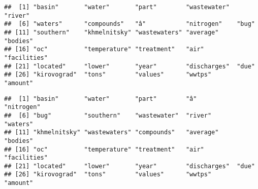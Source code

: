 \documentclass[
]{article}
\newenvironment{Shaded}{\begin{snugshade}}{\end{snugshade}}
\newcommand{\CommentTok}[1]{\textcolor[rgb]{0.56,0.35,0.01}{\textit{#1}}}
\newcommand{\DecValTok}[1]{\textcolor[rgb]{0.00,0.00,0.81}{#1}}
\newcommand{\FunctionTok}[1]{\textcolor[rgb]{0.00,0.00,0.00}{#1}}
\newcommand{\NormalTok}[1]{#1}
\newcommand{\OtherTok}[1]{\textcolor[rgb]{0.56,0.35,0.01}{#1}}
\newcommand{\SpecialCharTok}[1]{\textcolor[rgb]{0.00,0.00,0.00}{#1}}
\begin{document}
\begin{Shaded}
\end{Shaded}

\begin{verbatim}
##  [1] "basin"       "water"       "part"        "wastewater"  "river"      
##  [6] "waters"      "compounds"   "â"           "nitrogen"    "bug"        
## [11] "southern"    "khmelnitsky" "wastewaters" "average"     "bodies"     
## [16] "oc"          "temperature" "treatment"   "air"         "facilities" 
## [21] "located"     "lower"       "year"        "discharges"  "due"        
## [26] "kirovograd"  "tons"        "values"      "wwtps"       "amount"
\end{verbatim}

\begin{Shaded}
\end{Shaded}

\begin{verbatim}
##  [1] "basin"       "water"       "part"        "â"           "nitrogen"   
##  [6] "bug"         "southern"    "wastewater"  "river"       "waters"     
## [11] "khmelnitsky" "wastewaters" "compounds"   "average"     "bodies"     
## [16] "oc"          "temperature" "treatment"   "air"         "facilities" 
## [21] "located"     "lower"       "year"        "discharges"  "due"        
## [26] "kirovograd"  "tons"        "values"      "wwtps"       "amount"
\end{verbatim}
\end{document}
